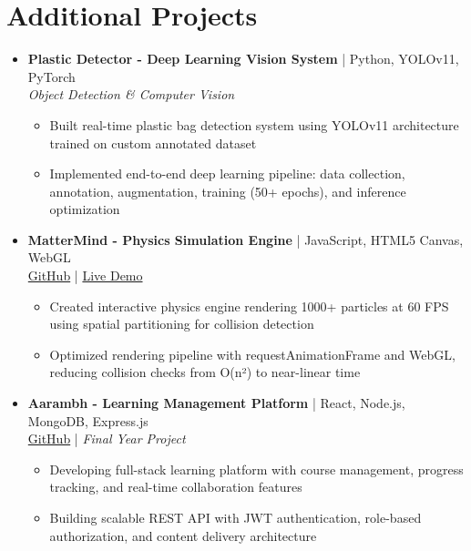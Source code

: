 \documentclass[11pt,a4paper]{article}
\newcommand{\resumeItem}[1]{
  \item\small{#1 \vspace{-1pt}}
}
\begin{document}
\section{Additional Projects}
\begin{itemize}[leftmargin=*]

\item \textbf{Plastic Detector - Deep Learning Vision System} | Python, YOLOv11, PyTorch \\
\textit{Object Detection \& Computer Vision}
\begin{itemize}[leftmargin=*]
\resumeItem{Built real-time plastic bag detection system using YOLOv11 architecture trained on custom annotated dataset}
\resumeItem{Implemented end-to-end deep learning pipeline: data collection, annotation, augmentation, training (50+ epochs), and inference optimization}
\end{itemize}

\item \textbf{MatterMind - Physics Simulation Engine} | JavaScript, HTML5 Canvas, WebGL \\
\href{https://github.com/Dhairya3391/MatterMind}{GitHub} | \href{https://matter-mind-aanocwu5z-dhairya3391s-projects.vercel.app/}{Live Demo}
\begin{itemize}[leftmargin=*]
\resumeItem{Created interactive physics engine rendering 1000+ particles at 60 FPS using spatial partitioning for collision detection}
\resumeItem{Optimized rendering pipeline with requestAnimationFrame and WebGL, reducing collision checks from O(n²) to near-linear time}
\end{itemize}

\item \textbf{Aarambh - Learning Management Platform} | React, Node.js, MongoDB, Express.js \\
\href{https://github.com/Dhairya3391}{GitHub} | \textit{Final Year Project}
\begin{itemize}[leftmargin=*]
\resumeItem{Developing full-stack learning platform with course management, progress tracking, and real-time collaboration features}
\resumeItem{Building scalable REST API with JWT authentication, role-based authorization, and content delivery architecture}
\end{itemize}

\end{itemize}

\end{document}
